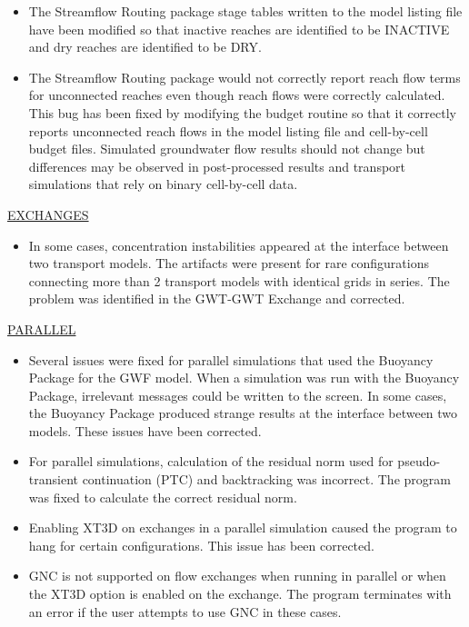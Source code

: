 \begin{itemize}
		\item The Streamflow Routing package stage tables written to the model listing file have been modified so that inactive reaches are identified to be INACTIVE and dry reaches are identified to be DRY.
		\item The Streamflow Routing package would not correctly report reach flow terms for unconnected reaches even though reach flows were correctly calculated. This bug has been fixed by modifying the budget routine so that it correctly reports unconnected reach flows in the model listing file and cell-by-cell budget files. Simulated groundwater flow results should not change but differences may be observed in post-processed results and transport simulations that rely on binary cell-by-cell data.
	\end{itemize}


	\underline{EXCHANGES}
	\begin{itemize}
		\item In some cases, concentration instabilities appeared at the interface between two transport models. The artifacts were present for rare configurations connecting more than 2 transport models with identical grids in series.  The problem was identified in the GWT-GWT Exchange and corrected.
	\end{itemize}

	\underline{PARALLEL}
	\begin{itemize}
		\item Several issues were fixed for parallel simulations that used the Buoyancy Package for the GWF model.  When a simulation was run with the Buoyancy Package, irrelevant messages could be written to the screen.  In some cases, the Buoyancy Package produced  strange results at the interface between two models.  These issues have been corrected.
		\item For parallel simulations, calculation of the residual norm used for pseudo-transient continuation (PTC) and backtracking was incorrect.  The program was fixed to calculate the correct residual norm.
		\item Enabling XT3D on exchanges in a parallel simulation caused the program to hang for certain configurations. This issue has been corrected.
		\item GNC is not supported on flow exchanges when running in parallel or when the XT3D option is enabled on the exchange. The program terminates with an error if the user attempts to use GNC in these cases.
	\end{itemize}
